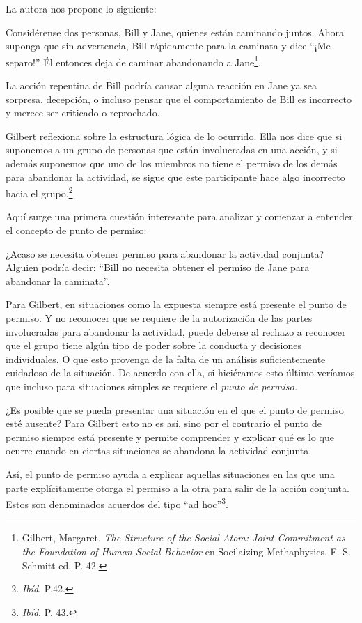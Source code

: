 \documentclass[oneside]{book}
\begin{document}
La autora nos propone lo siguiente:

Considérense dos personas, Bill y Jane, quienes  están caminando juntos. Ahora suponga que sin advertencia, Bill rápidamente para la caminata y dice “¡Me separo!” Él entonces deja de caminar abandonando a Jane\footnote{Gilbert, Margaret. \textit{The Structure of the Social Atom: Joint Commitment as the Foundation of Human Social Behavior} en Socilaizing Methaphysics. F. S. Schmitt ed. P. 42.}.

La acción repentina de Bill podría causar alguna reacción en Jane ya sea sorpresa, decepción, o incluso pensar que el comportamiento de Bill es incorrecto y merece ser criticado o reprochado.

Gilbert reflexiona sobre la estructura lógica de lo ocurrido. Ella nos dice que si suponemos a un grupo de personas que están involucradas en una acción, y si además suponemos que uno de los miembros no tiene el permiso de los demás para abandonar la actividad, se sigue que este participante hace algo incorrecto hacia el grupo.\footnote{\textit{Ibíd}. P.42.}

Aquí surge una primera cuestión interesante para analizar y comenzar a entender el concepto de punto de permiso: 

¿Acaso se necesita obtener permiso para abandonar la actividad conjunta? Alguien  podría decir: “Bill no necesita obtener el permiso de Jane para abandonar la caminata”.

Para Gilbert, en situaciones como la expuesta siempre está presente el punto de permiso. Y no reconocer que se requiere de la autorización de las partes involucradas para abandonar la actividad, puede deberse al rechazo a reconocer que el grupo tiene algún tipo de poder sobre la conducta y decisiones individuales. O que esto provenga de la falta de un análisis suficientemente cuidadoso de la situación. De acuerdo con ella, si hiciéramos esto último veríamos que incluso para situaciones simples se requiere el \textit{punto de permiso.}

¿Es posible que se pueda presentar una situación en el que el punto de permiso esté ausente? Para Gilbert esto no es así, sino por el contrario el punto de permiso siempre está presente y permite comprender y explicar qué es lo que ocurre cuando en ciertas situaciones se abandona la actividad conjunta. 

Así, el punto de permiso ayuda a explicar aquellas situaciones en las que una parte explícitamente otorga el permiso a la otra para salir de la acción conjunta. Estos son denominados acuerdos del tipo “ad hoc”\footnote{\textit{Ibíd}. P. 43.}.
\end{document}
